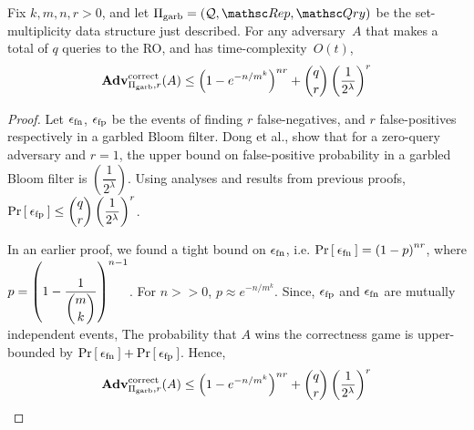 \begin{theorem}\label{thm:gbf-correctnessUB}
Fix $k,m,n,r>0$, and let $\setprim_{\mathrm{garb}}= (\calQ,\Rep, \Qry)$ be the set-multiplicity data structure just described. For any adversary~$A$ that makes a total of $q$ queries to the RO, and has time-complexity~$O(t)$,
\[
\mathrm{\mathbf{Adv}}^{\mathrm{correct}}_{\Pi_{\mathrm{garb}},r}(A)  \leq \left(1 - e^{-n/m^k}\right)^{nr} + \dbinom{q}{r}\left(\dfrac{1}{2^\lambda}\right)^r
\]
\end{theorem}

\begin{proof}
Let $\epsilon_{\mathrm{fn}}$, $\epsilon_{\mathrm{fp}}$ be the events of finding $r$ false-negatives, and $r$ false-positives respectively in a garbled Bloom filter. Dong et al.\cite{dong2013private}, show that for a zero-query adversary and $r=1$, the upper bound on false-positive probability in a garbled Bloom filter is $\left(\dfrac{1}{2^\lambda}\right)$. Using analyses and results from  previous proofs, $\Pr\left[\: \epsilon_{\mathrm{fp}} \:\right] \leq \dbinom{q}{r}\left(\dfrac{1}{2^\lambda}\right)^r$. 

In an earlier proof, we found a tight bound on $\epsilon_{\mathrm{fn}}$, i.e. $\Pr\left[\: \epsilon_{\mathrm{fn}} \:\right] = \left( 1-p \right)^{nr}$, where $p = \left( 1-\dfrac{1}{\dbinom{m}{k}} \right)^{n-1}$. For $n >> 0$, $p \approx  e^{-n/m^k}$. Since, $\epsilon_{\mathrm{fp}}$ and $\epsilon_{\mathrm{fn}}$ are mutually independent events, The probability that $A$ wins the correctness game is upper-bounded by $\Pr\left[\: \epsilon_{\mathrm{fn}} \:\right] + \Pr\left[\: \epsilon_{\mathrm{fp}} \:\right]$. Hence,
\[
\mathrm{\mathbf{Adv}}^{\mathrm{correct}}_{\Pi_{\mathrm{garb}},r}(A)  \leq \left(1 - e^{-n/m^k}\right)^{nr} + \dbinom{q}{r}\left(\dfrac{1}{2^\lambda}\right)^r
\]
\end{proof}
